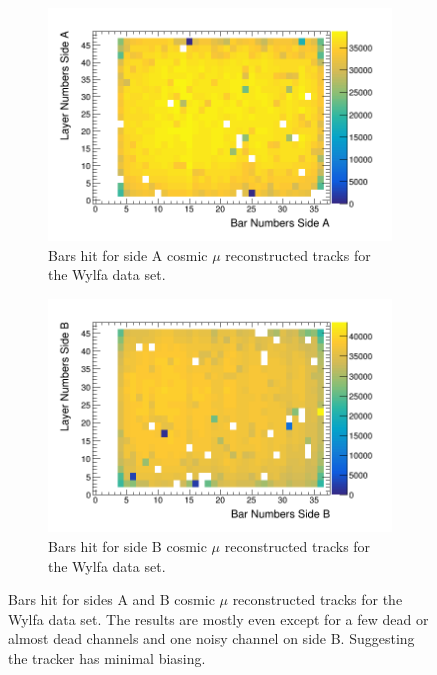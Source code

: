 \begin{figure}[!h]
\centering
\begin{subfigure}{.5\textwidth}
  \centering
  \includegraphics[width=\linewidth]{Chapter5/Figs/wylfaRasterNew/wylfaSideAHits.png}
  \captionsetup{width=.9\linewidth}
  \caption{Bars hit for side A cosmic $\mu$ reconstructed tracks for the Wylfa data set.}
  \label{subFig:wylfaSideAHits}
\end{subfigure}%
\begin{subfigure}{.5\textwidth}
  \centering
\includegraphics[width=\linewidth]{Chapter5/Figs/wylfaRasterNew/wylfaSideBHits.png}
  \captionsetup{width=.9\linewidth}
  \caption{Bars hit for side B cosmic $\mu$ reconstructed tracks for the Wylfa data set.}
  \label{subFig:wylfaSideBHits}
\end{subfigure}
\caption{Bars hit for sides A and B cosmic $\mu$ reconstructed tracks for the Wylfa data set. The results are mostly even except for a few dead or almost dead channels and one noisy channel on side B. Suggesting the tracker has minimal biasing.}
\label{fig:wylfaSideABHits}
\end{figure}


